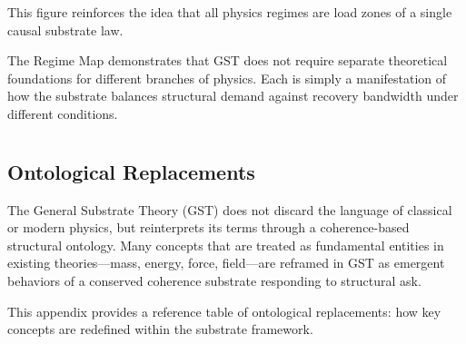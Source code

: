 \documentclass[entropy,article,submit,pdftex,moreauthors]{Definitions/mdpi}
\begin{document}
This figure reinforces the idea that all physics regimes are load zones of a single causal substrate law.

\vspace{1em}

The Regime Map demonstrates that GST does not require separate theoretical foundations for different branches of physics. Each is simply a manifestation of how the substrate balances structural demand against recovery bandwidth under different conditions.
\section[\appendixname~\thesection]{}
\subsection[\appendixname~\thesubsection]{Ontological Replacements}
\label{app:ontological-replacements}

The General Substrate Theory (GST) does not discard the language of classical or modern physics, but reinterprets its terms through a coherence-based structural ontology. Many concepts that are treated as fundamental entities in existing theories—mass, energy, force, field—are reframed in GST as emergent behaviors of a conserved coherence substrate responding to structural ask.

This appendix provides a reference table of ontological replacements: how key concepts are redefined within the substrate framework.
\end{document}

